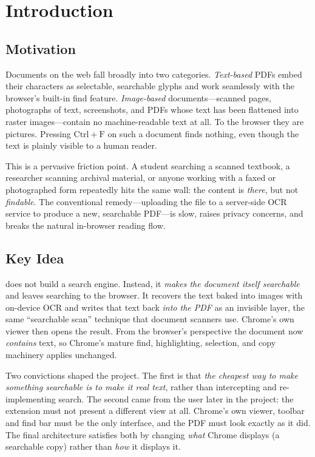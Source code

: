 \section{Introduction}
\label{sec:intro}

\subsection{Motivation}
Documents on the web fall broadly into two categories. \emph{Text-based} PDFs
embed their characters as selectable, searchable glyphs and work seamlessly with
the browser's built-in find feature. \emph{Image-based} documents---scanned
pages, photographs of text, screenshots, and PDFs whose text has been flattened
into raster images---contain no machine-readable text at all. To the browser
they are pictures. Pressing $\mathrm{Ctrl}{+}\mathrm{F}$ on such a document finds
nothing, even though the text is plainly visible to a human reader.

This is a pervasive friction point. A student searching a scanned textbook, a
researcher scanning archival material, or anyone working with a faxed or
photographed form repeatedly hits the same wall: the content is \emph{there}, but
not \emph{findable}. The conventional remedy---uploading the file to a
server-side OCR service to produce a new, searchable PDF---is slow, raises
privacy concerns, and breaks the natural in-browser reading flow.

\subsection{Key Idea}
\proj{} does not build a search engine. Instead, it \emph{makes the document
itself searchable} and leaves searching to the browser. It recovers the text
baked into images with on-device OCR and writes that text back \emph{into the
PDF} as an invisible layer, the same ``searchable scan'' technique that document
scanners use. Chrome's own viewer then opens the result. From the browser's
perspective the document now \emph{contains} text, so Chrome's mature find,
highlighting, selection, and copy machinery applies unchanged.

Two convictions shaped the project. The first is that \emph{the cheapest way to
make something searchable is to make it real text}, rather than intercepting and
re-implementing search. The second came from the user later in the project: the
extension must not present a different view at all. Chrome's own viewer, toolbar
and find bar must be the only interface, and the PDF must look exactly as it
did. The final architecture satisfies both by changing \emph{what} Chrome
displays (a searchable copy) rather than \emph{how} it displays it.

